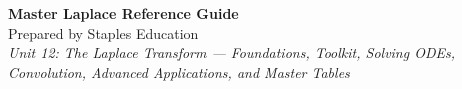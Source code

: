 




\begin{center}
    {\LARGE \bfseries Master Laplace Reference Guide}\\[6pt]
    {\large Prepared by Staples Education}\\[4pt]
    {\itshape Unit 12: The Laplace Transform --- Foundations, Toolkit, Solving ODEs,
    Convolution, Advanced Applications, and Master Tables}
\end{center}

\vspace{0.4em}

\tableofcontents

\vspace{0.4em}

